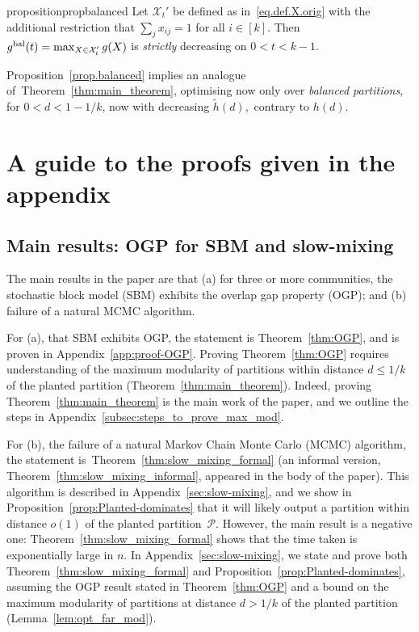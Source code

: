 \documentclass[a4paper,UKenglish,cleveref, autoref, thm-restate,numberwithinsect]{lipics-v2021}
\newcommand{\cP}{\mathcal{P}}
\begin{document}
\begin{restatable}
{proposition}{propbalanced}\label{prop.balanced}
Let $\mathcal{X}_t'$ be defined as in~\eqref{eq.def.X.orig} with the additional restriction that $\sum_j x_{ij} =1$ for all $i\in[k]$. Then $g^{\rm bal}(t)=\max_{X \in \mathcal{X}_t'}g(X)$ is {\em strictly} decreasing on $0<t<k-1$.
\end{restatable}


Proposition~\ref{prop.balanced} implies an analogue of~Theorem~\ref{thm:main_theorem}, optimising now only over \emph{balanced partitions}, for $0<d<1-1/k$, now with decreasing $\tilde{h}(d),$ contrary to 
$h(d)$. %


%
%



\newpage
\appendix
\section{A guide to the proofs given in the appendix}
\subsection{Main results: OGP for SBM and slow-mixing}

The main results in the paper are that (a) for three or more communities, the stochastic block model (SBM) exhibits the overlap gap property (OGP); and (b) failure of a natural MCMC algorithm. 

For (a), that SBM exhibits OGP, the statement is  Theorem~\ref{thm:OGP}, and is proven in Appendix~\ref{app:proof-OGP}. Proving Theorem~\ref{thm:OGP} requires understanding of the maximum modularity of partitions within distance $d\leq 1/k$ of the planted partition (Theorem~\ref{thm:main_theorem}). Indeed, proving Theorem~\ref{thm:main_theorem} is the main work of the paper, and we outline the steps in Appendix~\ref{subsec:steps_to_prove_max_mod}.  

For (b), the failure of a natural Markov Chain Monte Carlo (MCMC) algorithm, the statement is~Theorem~\ref{thm:slow_mixing_formal} (an informal version, Theorem~\ref{thm:slow_mixing_informal}, appeared in the body of the paper).
This algorithm is described in Appendix~\ref{sec:slow-mixing}, and we show in Proposition~\ref{prop:Planted-dominates} that it will likely output a partition within distance $o(1)$ of the planted partition~$\cP$. However, the main result is a negative one: Theorem~\ref{thm:slow_mixing_formal} shows that the time taken is exponentially large in $n$. In Appendix~\ref{sec:slow-mixing}, we state and prove both Theorem~\ref{thm:slow_mixing_formal} and Proposition~\ref{prop:Planted-dominates}, assuming the OGP result stated in Theorem~\ref{thm:OGP} and a bound on the maximum modularity of partitions at distance $d>1/k$ of the planted partition (Lemma~\ref{lem:opt_far_mod}).
\end{document}
